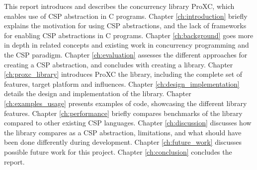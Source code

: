 This report introduces and describes the concurrency library ProXC, which enables use of CSP abstraction in C programs. Chapter \ref{ch:introduction} briefly explains the motivation for using CSP abstractions, and the lack of frameworks for enabling CSP abstractions in C programs. Chapter \ref{ch:background} goes more in depth in related concepts and existing work in concurrency programming and the CSP paradigm. Chapter \ref{ch:evaluation} assesses the different approaches for creating a CSP abstraction, and concludes with creating a library. Chapter \ref{ch:proxc_library} introduces ProXC the library, including the complete set of features, target platform and influences. Chapter \ref{ch:design_implementation} details the design and implementation of the library. Chapter \ref{ch:examples_usage} presents examples of code, showcasing the different library features. Chapter \ref{ch:performance} briefly compares benchmarks of the library compared to other existing CSP languages. Chapter \ref{ch:discussion} discusses how the library compares as a CSP abstraction, limitations, and what should have been done differently during development. Chapter \ref{ch:future_work} discusses possible future work for this project. Chapter \ref{ch:conclusion} concludes the report.

